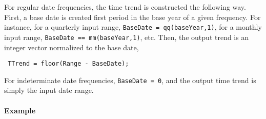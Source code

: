  For regular date frequencies, the time trend is constructed the
 following way. First, a base date is created first period in the base
 year of a given frequency. For instance, for a quarterly input range,
 \texttt{BaseDate = qq(baseYear,1)}, for a monthly input range,
 \texttt{BaseDate == mm(baseYear,1)}, etc. Then, the output trend is an
 integer vector normalized to the base date,
 
 \begin{verbatim}
 TTrend = floor(Range - BaseDate);
 \end{verbatim}
 
 For indeterminate date frequencies, \texttt{BaseDate = 0}, and the
 output time trend is simply the input date range.
 
 \paragraph{Example}


